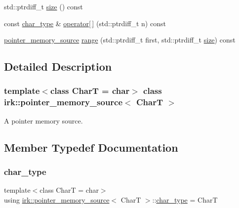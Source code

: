 \begin{DoxyCompactItemize}
\item 
std\+::ptrdiff\+\_\+t \mbox{\hyperlink{classirk_1_1pointer__memory__source_a6eafc7470d86718ade875dcd87439a2b}{size}} () const
\item 
const \mbox{\hyperlink{classirk_1_1pointer__memory__source_a4b778df8efee229fdafbd4de413dbf61}{char\+\_\+type}} \& \mbox{\hyperlink{classirk_1_1pointer__memory__source_afefcceccbd8ed5c7bbbb9fe10a540a18}{operator\mbox{[}$\,$\mbox{]}}} (std\+::ptrdiff\+\_\+t n) const
\item 
\mbox{\hyperlink{classirk_1_1pointer__memory__source}{pointer\+\_\+memory\+\_\+source}} \mbox{\hyperlink{classirk_1_1pointer__memory__source_aaa293b1a679eed5eebcf91f0bb1f5023}{range}} (std\+::ptrdiff\+\_\+t first, std\+::ptrdiff\+\_\+t \mbox{\hyperlink{classirk_1_1pointer__memory__source_a6eafc7470d86718ade875dcd87439a2b}{size}}) const
\end{DoxyCompactItemize}


\subsection{Detailed Description}
\subsubsection*{template$<$class CharT = char$>$\newline
class irk\+::pointer\+\_\+memory\+\_\+source$<$ Char\+T $>$}

A pointer memory source. 

\subsection{Member Typedef Documentation}
\mbox{\label{classirk_1_1pointer__memory__source_a4b778df8efee229fdafbd4de413dbf61}} 
\subsubsection{\texorpdfstring{char\+\_\+type}{char\_type}}
{\footnotesize\ttfamily template$<$class CharT  = char$>$ \\
using \mbox{\hyperlink{classirk_1_1pointer__memory__source}{irk\+::pointer\+\_\+memory\+\_\+source}}$<$ CharT $>$\+::\mbox{\hyperlink{classirk_1_1pointer__memory__source_a4b778df8efee229fdafbd4de413dbf61}{char\+\_\+type}} =  CharT}

